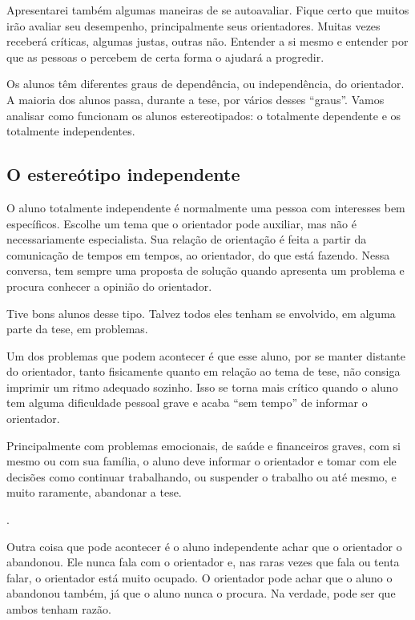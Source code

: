 Apresentarei também algumas maneiras de se autoavaliar. Fique certo que muitos irão avaliar seu desempenho, principalmente seus orientadores. Muitas vezes receberá críticas, algumas justas, outras não. Entender a si mesmo e entender por que as pessoas o percebem de certa forma o ajudará a progredir.


Os alunos têm diferentes graus de dependência, ou independência, do orientador. A maioria dos alunos passa, durante a tese, por vários desses “graus”. Vamos analisar como funcionam os alunos estereotipados: o totalmente dependente e os totalmente independentes.


\subsection{O estereótipo independente}


O aluno totalmente independente é normalmente uma pessoa com interesses bem específicos. Escolhe um tema que o orientador pode auxiliar, mas não é necessariamente especialista. Sua relação de orientação é feita a partir da comunicação de tempos em tempos, ao orientador, do que está fazendo. Nessa conversa, tem sempre uma proposta de solução quando apresenta um problema e procura conhecer a opinião do orientador. 


Tive bons alunos desse tipo. Talvez todos eles tenham se envolvido, em alguma parte da tese, em problemas.


Um dos problemas que podem acontecer é que esse aluno, por se manter distante do orientador, tanto fisicamente quanto em relação ao tema de tese, não consiga imprimir um ritmo adequado sozinho. Isso se torna mais crítico quando o aluno tem alguma dificuldade pessoal grave e acaba “sem tempo” de informar o orientador.



Principalmente com problemas emocionais, de saúde e financeiros graves, com si mesmo ou com sua família, o aluno deve informar o orientador e tomar com ele decisões como continuar trabalhando, ou suspender o trabalho ou até mesmo, e muito raramente, abandonar a tese. 

.


Outra coisa que pode acontecer é o aluno independente achar que o orientador o abandonou. Ele nunca fala com o orientador e, nas raras vezes que fala ou tenta falar, o orientador está muito ocupado. O orientador pode achar que o aluno o abandonou também, já que o aluno nunca o procura. Na verdade, pode ser que ambos tenham razão. 


